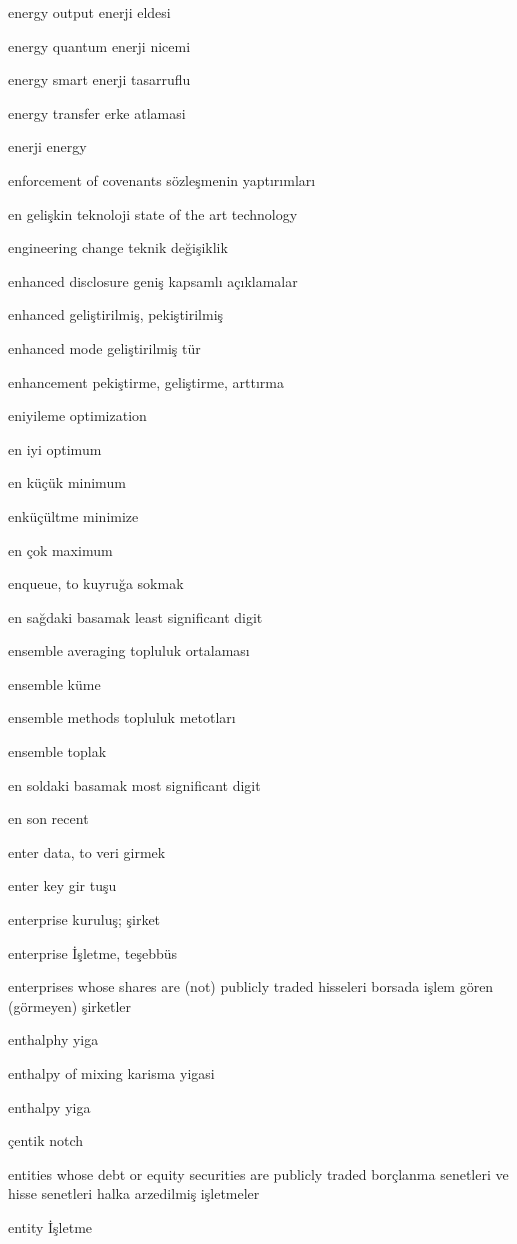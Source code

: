 \documentclass[12pt,fleqn]{article}\usepackage{../../common}
\begin{document}
energy output enerji eldesi

energy quantum enerji nicemi

energy smart enerji tasarruflu

energy transfer erke atlamasi

enerji energy

enforcement of covenants sözleşmenin yaptırımları

en gelişkin teknoloji state of the art technology

engineering change teknik değişiklik

enhanced disclosure geniş kapsamlı açıklamalar

enhanced geliştirilmiş, pekiştirilmiş

enhanced mode geliştirilmiş tür

enhancement pekiştirme, geliştirme, arttırma

eniyileme optimization

en iyi optimum

en küçük minimum

enküçültme minimize

en çok maximum

enqueue, to kuyruğa sokmak

en sağdaki basamak least significant digit

ensemble averaging topluluk ortalaması

ensemble küme

ensemble methods topluluk metotları

ensemble toplak

en soldaki basamak most significant digit

en son recent

enter data, to veri girmek

enter key gir tuşu

enterprise kuruluş; şirket

enterprise İşletme, teşebbüs

enterprises whose shares are (not) publicly traded hisseleri borsada işlem gören (görmeyen) şirketler

enthalphy yiga

enthalpy of mixing karisma yigasi

enthalpy yiga

çentik notch

entities whose debt or equity securities are publicly traded borçlanma senetleri ve hisse senetleri halka arzedilmiş işletmeler

entity İşletme
\end{document}
